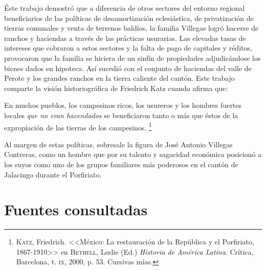 \documentclass[14pt,twoside,final]{extbook} %
\let\oldfootnote\footnote
\renewcommand\footnote[1]{%
\oldfootnote{\hspace{1mm}#1}}
\begin{document}
Éste trabajo demostró que a diferencia de otros sectores del entorno regional beneficiarios de las políticas de desamortización eclesiástica, de privatización de tierras comunales y venta de terrenos baldíos, la familia Villegas logró hacerse de ranchos y haciendas a través de las prácticas usurarias. Las elevadas tasas de intereses que cobraron a estos sectores y la falta de pago de capitales y réditos, provocaron que la familia se hiciera de un sinfín de propiedades adjudicándose los bienes dados en hipoteca. Así sucedió con el conjunto de haciendas del valle de Perote y los grandes ranchos en la tierra caliente del cantón. Este trabajo comparte la visión historiográfica de Friedrich Katz cuando afirma que:
\begin{quoting}
En muchos pueblos, los campesinos ricos, los usureros y los hombres fuertes locales \emph{que no eran hacendados} se beneficiaron tanto o más que éstos de la expropiación de las tierras de los campesinos.\footnote{\textsc{Katz}, Friedrich. <<México: La restauración de la República y el Porfiriato, 1867-1910>> en \textsc{Bethell}, Leslie (Ed.) \emph{Historia de América Latina}. Crítica, Barcelona, t. \textsc{ix}, 2000, p. 53. Cursivas mías.}
\end{quoting}
Al margen de estas políticas, sobresale la figura de José Antonio Villegas Contreras, como un hombre que por su talento y sagacidad económica posicionó a los suyos como uno de los grupos familiares más poderosos en el cantón de Jalacingo durante el Porfiriato.
\newpage
\pagestyle{empty}
\null\vfill
\chapter*{Fuentes consultadas}\label{ch:fuentes-consultadas}
\thispagestyle{empty}
\pagestyle{fancy}
\fancyhf{} %
\fancyhead[RO,LE]{\thepage}
\renewcommand{\headrulewidth}{0pt}
\setcounter{page}{131}
\end{document}
